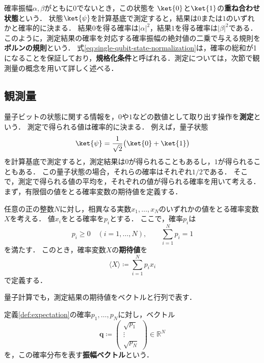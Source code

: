 確率振幅$\alpha,\beta$がともに$0$でないとき，この状態を
$\ket{0}$と$\ket{1}$の\textbf{重ね合わせ状態}という．
状態$\ket{\psi}$を計算基底で測定すると，結果は$0$または$1$のいずれかと確率的に決まる．
結果$0$を得る確率は$|\alpha|^2$，結果$1$を得る確率は$|\beta|^2$である．
このように，測定結果の確率を対応する確率振幅の絶対値の二乗で与える規則を\textbf{ボルンの規則}という．
式\eqref{eq:single-qubit-state-normalization}は，確率の総和が1になることを保証しており，\textbf{規格化条件}と呼ばれる．測定については，次節で観測量の概念を用いて詳しく述べる．

\subsection{観測量}
\label{subsec:observables}

量子ビットの状態に関する情報を，$0$や$1$などの数値として取り出す操作を\textbf{測定}という．
測定で得られる値は確率的に決まる．
例えば，量子状態
\begin{equation*}
  \ket{\psi}=\frac{1}{\sqrt{2}}\bigl(\ket{0}+\ket{1}\bigr)
\end{equation*}
を計算基底で測定すると，測定結果は$0$が得られることもあるし，$1$が得られることもある．
この量子状態の場合，それらの確率はそれぞれ$1/2$である．
そこで，測定で得られる値の平均を，それぞれの値が得られる確率を用いて考える．
まず，有限個の値をとる確率変数の期待値を定義する．

\begin{defi}[期待値]
  \label{def:expectation}
  任意の正の整数$N$に対し，相異なる実数$x_1,\ldots,x_N$のいずれかの値をとる確率変数$X$を考える．
  値$x_i$をとる確率を$p_i$とする．
  ここで，確率$p_i$は
  \begin{equation*}
    p_i\geq 0\quad(i=1,\ldots,N),
    \qquad
    \sum_{i=1}^{N}p_i=1
  \end{equation*}
  を満たす．
  このとき，確率変数$X$の\textbf{期待値}を
  \begin{equation}
    \langle X\rangle\coloneq\sum_{i=1}^{N}p_i x_i
    \label{eq:expectation-finite-distribution}
  \end{equation}
  で定義する．
\end{defi}

量子計算でも，測定結果の期待値をベクトルと行列で表す．

\begin{defi}[振幅ベクトル]
  \label{def:classical-amplitude-vector}
  定義\ref{def:expectation}の確率$p_1,\ldots,p_N$に対し，ベクトル
  \begin{equation}
    \bm{q}\coloneq
    \begin{pmatrix}
      \sqrt{p_1} \\
      \vdots     \\
      \sqrt{p_N}
    \end{pmatrix}
    \in\mathbb R^N
    \label{eq:classical-amplitude-vector}
  \end{equation}
  を，この確率分布を表す\textbf{振幅ベクトル}という．
\end{defi}

